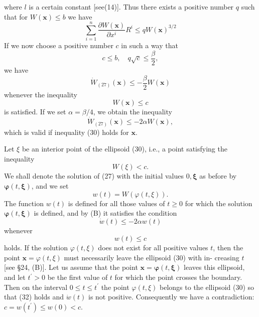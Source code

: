 \documentclass[10pt,a5paper]{book}
\makeatletter
\theoremstyle{plain}
\theoremstyle{definition}
\theoremstyle{remark}
\renewenvironment{proof}[1][\proofname]{\par
  \pushQED{\qed}%
  \normalfont\topsep6\p@\@plus6\p@\relax
  \trivlist
  \item\relax{\itshape #1\@addpunct{.}}\hspace\labelsep\ignorespaces
}{\popQED\endtrivlist\@endpefalse}
\makeatother
\begin{document}
\begin{proof}
\[\]
where $l$ is a certain constant [see(14)]. Thus there exists a positive number $q$ such that for $W(\mathbf{x}) \leq b$ we have
\[
\sum_{i=1}^{n} \frac{\partial W(\mathbf{x})}{\partial x^{i}} R^{i} \leq q W(\mathbf{x})^{3 / 2}
\]
If we now choose a positive number $c$ in such a way that
\[
c \leq b, \quad q \sqrt{c} \leq \frac{\beta}{2},
\]
we have
\[
\dot{W}_{(27)}(\mathbf{x}) \leq-\frac{\beta}{2} W(\mathbf{x})
\]
whenever the inequality
\begin{equation*}
W(\mathbf{x}) \leq c \tag{30}
\end{equation*}
is satisfied. If we set $\alpha=\beta / 4$, we obtain the inequality
\[
\dot{W}_{(27)}(\mathbf{x}) \leq-2 \alpha W(\mathbf{x}),
\]
which is valid if inequality (30) holds for $\mathbf{x}$.

Let $\xi$ be an interior point of the ellipsoid (30), i.e., a point satisfying the inequality
\begin{equation*}
W(\xi)<c . \tag{31}
\end{equation*}
We shall denote the solution of (27) with the initial values $0, \boldsymbol{\xi}$ as before by $\boldsymbol{\varphi}(t, \boldsymbol{\xi})$, and we set
\[
w(t)=W(\varphi(t, \xi)) .
\]
The function $w(t)$ is defined for all those values of $t \geq 0$ for which the solution $\boldsymbol{\varphi}(t, \boldsymbol{\xi})$ is defined, and by (B) it satisfies the condition
\begin{equation*}
\dot{w}(t) \leq-2 \alpha w(t) \tag{32}
\end{equation*}
whenever
\begin{equation*}
w(t) \leq c \tag{33}
\end{equation*}
holds. If the solution $\varphi(t, \xi)$ does not exist for all positive values $t$, then the point $\mathbf{x}=\varphi(t, \xi)$ must necessarily leave the ellipsoid (30) with in-
creasing $t$ [see §24, (B)]. Let us assume that the point $\mathbf{x}=\boldsymbol{\varphi}(t, \boldsymbol{\xi})$ leaves this ellipsoid, and let $t^{\prime}>0$ be the first value of $t$ for which the point crosses the boundary. Then on the interval $0 \leq t \leq t^{\prime}$ the point $\varphi(t, \xi)$ belongs to the ellipsoid (30) so that (32) holds and $\dot{w}(t)$ is not positive. Consequently we have a contradiction: $c=w\left(t^{\prime}\right) \leq w(0)<c$.


\end{proof}
\end{document}
